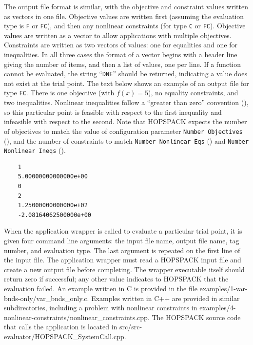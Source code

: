 The output file format is similar, with the objective and constraint values
written as vectors in one file.
Objective values are written first
(assuming the evaluation type is {\tt F} or {\tt FC}), and then any nonlinear
constraints (for type {\tt C} or {\tt FC}).
Objective values are written as a vector to allow applications
with multiple objectives.  Constraints are written as
two vectors of values:  one for equalities and one for inequalities.
In all three cases the format of a vector begins with a header line giving
the number of items, and then a list of values, one per line.
If a function cannot be evaluated, the string ``{\tt DNE}'' should be returned,
indicating a value does not exist at the trial point.
The text below shows an example of an output file for type {\tt FC}.
There is one objective (with $f(x) = 5$), no equality constraints,
and two inequalities.
Nonlinear inequalities follow a ``greater than zero'' convention
(), so this particular point is feasible
with respect to the first inequality and infeasible with respect to the second.
Note that HOPSPACK expects the number of objectives to match the value
of configuration parameter
{\tt Number Objectives} (), and the number of
constraints to match {\tt Number Nonlinear Eqs} ()
and {\tt Number Nonlinear Ineqs} ().
\vspace{-11pt}
\begin{verbatim}
    1
    5.00000000000000e+00
    0
    2
    1.25000000000000e+02
    -2.08164062500000e+00
\end{verbatim}

When the application wrapper is called to evaluate a particular trial point,
it is given four command line arguments:  the input file name, output file name,
tag number, and evaluation type.  The last argument is repeated on the
first line of the input file.
The application wrapper must read a HOPSPACK input file and create a new
output file before completing.  The wrapper executable itself should return
zero if successful; any other value indicates to HOPSPACK that the evaluation
failed.
An example written in C is provided in the file
{\sf examples/1-var-bnds-only/var\_bnds\_only.c}.  Examples written in C++
are provided in similar subdirectories, including a problem with nonlinear
constraints in {\sf examples/4-nonlinear-constraints/nonlinear\_constraints.cpp}.
The HOPSPACK source code that calls the application is located in
{\sf src/src-evaluator/HOPSPACK\_SystemCall.cpp}.

